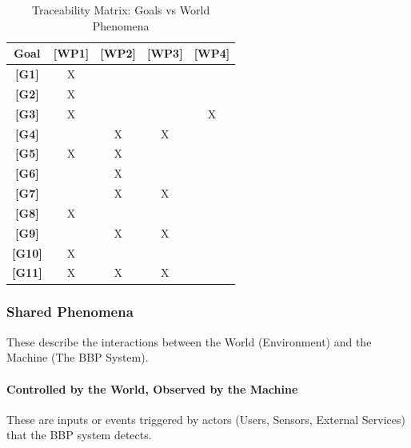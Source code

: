 \begin{table}[h]
\centering
\begin{tabular}{|c|c|c|c|c|}
\hline
\textbf{Goal} & \textbf{[WP1]} & \textbf{[WP2]} & \textbf{[WP3]} & \textbf{[WP4]} \\ \hline
\textbf{[G1]}   & X            &              &              &              \\ \hline
\textbf{[G2]}   & X            &              &              &              \\ \hline
\textbf{[G3]}   & X            &              &              & X            \\ \hline
\textbf{[G4]}   &              & X            & X            &              \\ \hline
\textbf{[G5]}   & X            & X            &              &              \\ \hline
\textbf{[G6]}   &              & X            &              &              \\ \hline
\textbf{[G7]}   &              & X            & X            &              \\ \hline
\textbf{[G8]}   & X            &              &              &              \\ \hline
\textbf{[G9]}   &              & X            & X            &              \\ \hline
\textbf{[G10]}  & X            &              &              &              \\ \hline
\textbf{[G11]}  & X            & X            & X            &              \\ \hline
\end{tabular}
\caption{Traceability Matrix: Goals vs World Phenomena}
\label{tab:traceability_matrix}
\end{table}

\subsubsection{Shared Phenomena}
These describe the interactions between the World (Environment) and the Machine (The BBP System).

\paragraph{Controlled by the World, Observed by the Machine}
These are inputs or events triggered by actors (Users, Sensors, External Services) that the BBP system detects.

